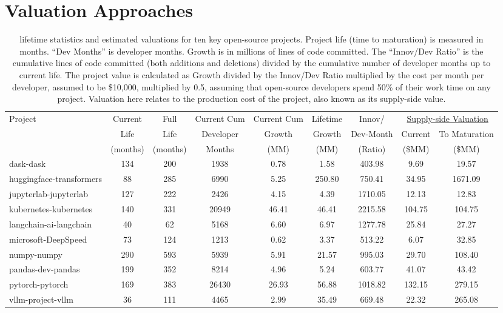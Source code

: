 \documentclass[conference]{IEEEtran}
\begin{document}
\section{Valuation Approaches}
\label{sec:valuation}


\begin{table}
\centering
\caption{\label{tab:valuation} \small lifetime statistics and estimated valuations for ten key open-source projects. Project life (time to maturation) is measured in months. ``Dev Months'' is developer months. Growth is in millions of lines of code committed. The ``Innov/Dev Ratio'' is the cumulative lines of code committed (both additions and deletions) divided by the cumulative number of developer months up to current life. The project value is calculated as Growth divided by the Innov/Dev Ratio multiplied by the cost per month per developer, assumed to be \$10,000, multiplied by 0.5, assuming that open-source developers spend 50\% of their work time on any project. Valuation here relates to the production cost of the project, also known as its supply-side value. 
}
\begin{tabular}{lcccccccc}
\toprule
Project & Current & Full  & Current Cum & Current Cum & Lifetime & Innov/ & \multicolumn{2}{c}{\underline{Supply-side Valuation}} \\
 & Life  & Life  & Developer & Growth  & Growth  & Dev-Month & Current  & To Maturation  \\
 & (months) & (months) & Months & (MM) & (MM) & (Ratio) & (\$MM) & (\$MM) \\
\midrule
dask-dask & 134 & 200 & 1938 & 0.78 & 1.58 & 403.98 & 9.69 & 19.57 \\
huggingface-transformers & 88 & 285 & 6990 & 5.25 & 250.80 & 750.41 & 34.95 & 1671.09 \\
jupyterlab-jupyterlab & 127 & 222 & 2426 & 4.15 & 4.39 & 1710.05 & 12.13 & 12.83 \\
kubernetes-kubernetes & 140 & 331 & 20949 & 46.41 & 46.41 & 2215.58 & 104.75 & 104.75 \\
langchain-ai-langchain & 40 & 62 & 5168 & 6.60 & 6.97 & 1277.78 & 25.84 & 27.27 \\
microsoft-DeepSpeed & 73 & 124 & 1213 & 0.62 & 3.37 & 513.22 & 6.07 & 32.85 \\
numpy-numpy & 290 & 593 & 5939 & 5.91 & 21.57 & 995.03 & 29.70 & 108.40 \\
pandas-dev-pandas & 199 & 352 & 8214 & 4.96 & 5.24 & 603.77 & 41.07 & 43.42 \\
pytorch-pytorch & 169 & 383 & 26430 & 26.93 & 56.88 & 1018.82 & 132.15 & 279.15 \\
vllm-project-vllm & 36 & 111 & 4465 & 2.99 & 35.49 & 669.48 & 22.32 & 265.08 \\
\bottomrule
\end{tabular}
\end{table}
\end{document}
